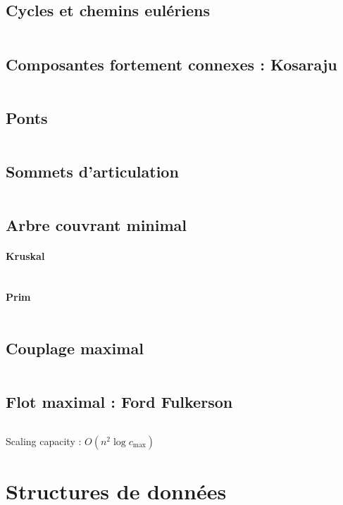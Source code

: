 \documentclass[10pt,twocolumn]{article}
\begin{document}
\subsection{Cycles et chemins eulériens}
\inputminted[breaklines,tabsize=4]{cpp}{code/euler.cpp}

\subsection{Composantes fortement connexes : Kosaraju}
\inputminted[breaklines,tabsize=4]{cpp}{code/kosaraju.cpp}

\subsection{Ponts}
\inputminted[breaklines,tabsize=4]{cpp}{code/bridges.cpp}

\subsection{Sommets d'articulation}
\inputminted[breaklines,tabsize=4]{cpp}{code/articulations.cpp}

\subsection{Arbre couvrant minimal}
\paragraph{Kruskal}
\inputminted[breaklines,tabsize=4]{cpp}{code/kruskal.cpp}
\paragraph{Prim}
\inputminted[breaklines,tabsize=4]{cpp}{code/prim.cpp}

\subsection{Couplage maximal}
\inputminted[breaklines,tabsize=4]{cpp}{code/matching.cpp}

\subsection{Flot maximal : Ford Fulkerson}
\inputminted[breaklines,tabsize=4]{cpp}{code/fordfulkerson.cpp}
Scaling capacity : $O(n^2 \log c_{\max})$

\section{Structures de données}
\end{document}
